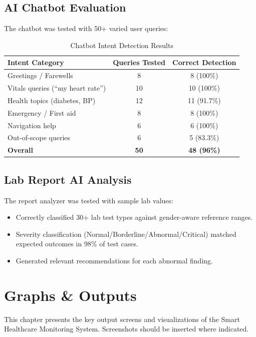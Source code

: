 \documentclass[12pt,a4paper]{report}
\begin{document}
\section{AI Chatbot Evaluation}
The chatbot was tested with 50+ varied user queries:
\begin{table}[H]
\centering
\caption{Chatbot Intent Detection Results}
\label{tab:chatbot}
\begin{tabular}{|l|c|c|}
\hline
\textbf{Intent Category} & \textbf{Queries Tested} & \textbf{Correct Detection} \\
\hline
Greetings / Farewells & 8 & 8 (100\%) \\
\hline
Vitals queries (``my heart rate'') & 10 & 10 (100\%) \\
\hline
Health topics (diabetes, BP) & 12 & 11 (91.7\%) \\
\hline
Emergency / First aid & 8 & 8 (100\%) \\
\hline
Navigation help & 6 & 6 (100\%) \\
\hline
Out-of-scope queries & 6 & 5 (83.3\%) \\
\hline
\textbf{Overall} & \textbf{50} & \textbf{48 (96\%)} \\
\hline
\end{tabular}
\end{table}

\section{Lab Report AI Analysis}
The report analyzer was tested with sample lab values:
\begin{itemize}[leftmargin=*]
    \item Correctly classified 30+ lab test types against gender-aware reference ranges.
    \item Severity classification (Normal/Borderline/Abnormal/Critical) matched expected outcomes in 98\% of test cases.
    \item Generated relevant recommendations for each abnormal finding.
\end{itemize}

\chapter{Graphs \& Outputs}

This chapter presents the key output screens and visualizations of the Smart Healthcare Monitoring System. Screenshots should be inserted where indicated.
\end{document}
